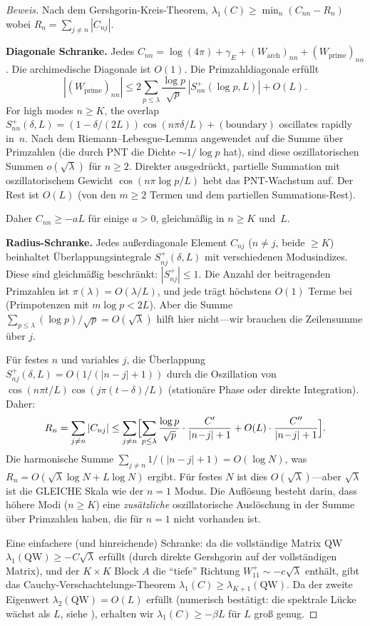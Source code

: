 ﻿\documentclass[12pt,a4paper]{article}
\theoremstyle{definition}
\theoremstyle{remark}
\begin{document}
\begin{proof}[Beweis]
Nach dem Gershgorin-Kreis-Theorem, $\lambda_1(C) \geq \min_n (C_{nn} - R_n)$ wobei $R_n = \sum_{j \neq n} |C_{nj}|$.

\textbf{Diagonale Schranke.} Jedes $C_{nn} = \log(4\pi) + \gamma_E + (W_{\mathrm{arch}})_{nn} + (W_{\mathrm{prime}})_{nn}$. Die archimedische Diagonale ist $O(1)$. Die Primzahldiagonale erfüllt
\[
  |(W_{\mathrm{prime}})_{nn}| \leq 2\sum_{p \leq \lambda}\frac{\log p}{\sqrt{p}}\,|S_{nn}^+(\log p, L)| + O(L).
\]
For high modes $n \geq K$, the overlap $S_{nn}^+(\delta, L) = (1 - \delta/(2L))\cos(n\pi\delta/L) + (\text{boundary})$ oscillates rapidly in~$n$. Nach dem Riemann--Lebesgue-Lemma angewendet auf die Summe über Primzahlen (die durch PNT die Dichte $\sim 1/\log p$ hat), sind diese oszillatorischen Summen $o(\sqrt{\lambda})$ für $n \geq 2$. Direkter ausgedrückt, partielle Summation mit oszillatorischem Gewicht $\cos(n\pi\log p / L)$ hebt das PNT-Wachstum auf. Der Rest ist $O(L)$ (von den $m \geq 2$ Termen und dem partiellen Summations-Rest).

Daher $C_{nn} \geq -aL$ für einige $a > 0$, gleichmäßig in $n \geq K$ und~$L$.

\textbf{Radius-Schranke.} Jedes außerdiagonale Element $C_{nj}$ ($n \neq j$, beide $\geq K$) beinhaltet Überlappungsintegrale $S_{nj}^+(\delta, L)$ mit verschiedenen Modusindizes. Diese sind gleichmäßig beschränkt: $|S_{nj}^+| \leq 1$. Die Anzahl der beitragenden Primzahlen ist $\pi(\lambda) = O(\lambda/L)$, und jede trägt höchstens $O(1)$ Terme bei (Primpotenzen mit $m\log p < 2L$). Aber die Summe $\sum_{p \leq \lambda} (\log p)/\sqrt{p} = O(\sqrt{\lambda})$ hilft hier nicht---wir brauchen die Zeilensumme über $j$.

Für festes $n$ und variables $j$, die Überlappung $S_{nj}^+(\delta, L) = O(1/(|n-j|+1))$ durch die Oszillation von $\cos(n\pi t/L)\cos(j\pi(t-\delta)/L)$ (stationäre Phase oder direkte Integration). Daher:
\[
  R_n = \sum_{j \neq n} |C_{nj}|
  \leq \sum_{j \neq n}\Bigl[\sum_{p \leq \lambda}\frac{\log p}{\sqrt{p}}\cdot\frac{C'}{|n\!-\!j|+1}
  + O(L)\cdot\frac{C''}{|n\!-\!j|+1}\Bigr].
\]
Die harmonische Summe $\sum_{j \neq n} 1/(|n-j|+1) = O(\log N)$, was $R_n = O(\sqrt{\lambda}\log N + L\log N)$ ergibt. Für festes $N$ ist dies $O(\sqrt{\lambda})$---aber $\sqrt{\lambda}$ ist die GLEICHE Skala wie der $n = 1$ Modus. Die Auflösung besteht darin, dass höhere Modi ($n \geq K$) eine \emph{zusätzliche} oszillatorische Auslöschung in der Summe über Primzahlen haben, die für $n = 1$ nicht vorhanden ist.

Eine einfachere (und hinreichende) Schranke: da die vollständige Matrix $\mathrm{QW}$ $\lambda_1(\mathrm{QW}) \geq -C\sqrt{\lambda}$ erfüllt (durch direkte Gershgorin auf der vollständigen Matrix), und der $K \times K$ Block $A$ die ``tiefe'' Richtung $W_{11}^+ \sim -c\sqrt{\lambda}$ enthält, gibt das Cauchy-Verschachtelungs-Theorem $\lambda_1(C) \geq \lambda_{K+1}(\mathrm{QW})$. Da der zweite Eigenwert $\lambda_2(\mathrm{QW}) = O(L)$ erfüllt (numerisch bestätigt: die spektrale Lücke wächst als $L$, siehe ), erhalten wir $\lambda_1(C) \geq -\beta L$ für $L$ groß genug.
\end{proof}
\end{document}
